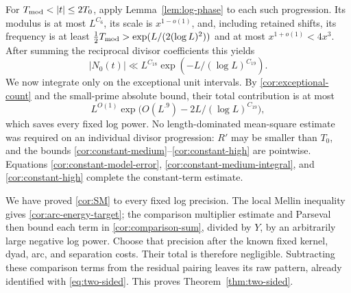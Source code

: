 For $T_{\rm mod}<|t|\leq2T_0$, apply
Lemma~\ref{lem:log-phase} to each such progression.  Its modulus is
at most $L^{C_6}$, its scale is $x^{1-o(1)}$, and, including retained
shifts, its frequency is at least
$\tfrac12T_{\rm mod}>\exp(L/(2(\log L)^2))$ and at most
$x^{1+o(1)}<4x^3$.
After summing the reciprocal divisor coefficients this yields
\begin{equation}\label{cor:constant-high}
 |N_0(t)|\ll L^{C_{18}}\exp(-L/(\log L)^{C_{19}}).
\end{equation}
We now integrate only on the exceptional unit intervals.  By
\eqref{cor:exceptional-count} and the small-prime absolute bound,
their total contribution is at most
\[
 L^{O(1)}\exp\bigl(O(L^{.9})-2L/(\log L)^{C_{19}}\bigr),
\]
which saves every fixed log power.  No length-dominated mean-square
estimate was required on an individual divisor progression: $R'$ may
be smaller than $T_0$, and the bounds
\eqref{cor:constant-medium}--\eqref{cor:constant-high} are pointwise.
Equations \eqref{cor:constant-model-error},
\eqref{cor:constant-medium-integral}, and \eqref{cor:constant-high}
complete the constant-term estimate.

We have proved \eqref{cor:SM} to every fixed log precision.  The local
Mellin inequality gives \eqref{cor:arc-energy-target}; the comparison
multiplier estimate and Parseval then bound each term in
\eqref{cor:comparison-sum}, divided by $Y$, by an arbitrarily large
negative log power.  Choose that precision after the known fixed
kernel, dyad, arc, and separation costs.  Their total is therefore
negligible.  Subtracting these comparison terms from the residual
pairing leaves its raw pattern, already identified with
\eqref{eq:two-sided}.  This proves Theorem~\ref{thm:two-sided}.
